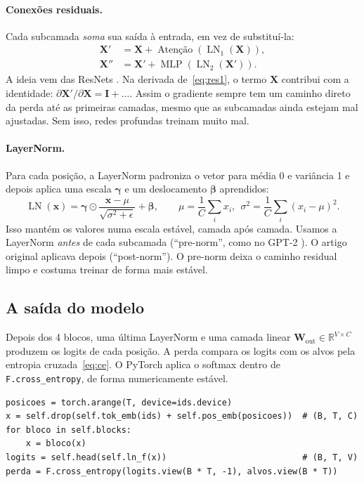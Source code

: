 \documentclass[11pt,a4paper]{article}
\newcommand{\R}{\mathbb{R}}
\newcommand{\LN}{\operatorname{LN}}
\begin{document}
\paragraph{Conexões residuais.} Cada subcamada \emph{soma} sua saída à entrada, em vez de substituí-la:
\begin{align}
\bm X' &= \bm X + \operatorname{Atenção}(\LN_1(\bm X)), \label{eq:res1}\\
\bm X'' &= \bm X' + \operatorname{MLP}(\LN_2(\bm X')). \label{eq:res2}
\end{align}
A ideia vem das ResNets \cite{he2016}. Na derivada de~\eqref{eq:res1}, o termo $\bm X$ contribui com a identidade: $\partial \bm X'/\partial \bm X = \bm I + \dots$. Assim o gradiente sempre tem um caminho direto da perda até as primeiras camadas, mesmo que as subcamadas ainda estejam mal ajustadas. Sem isso, redes profundas treinam muito mal.

\paragraph{LayerNorm.} Para cada posição, a LayerNorm \cite{layernorm} padroniza o vetor para média 0 e variância 1 e depois aplica uma escala $\bm\gamma$ e um deslocamento $\bm\beta$ aprendidos:
\begin{equation}
\LN(\bm x) = \bm\gamma \odot \frac{\bm x - \mu}{\sqrt{\sigma^2 + \epsilon}} + \bm\beta,
\qquad \mu = \frac1C\sum_i x_i,\ \ \sigma^2 = \frac1C\sum_i (x_i-\mu)^2.
\end{equation}
Isso mantém os valores numa escala estável, camada após camada. Usamos a LayerNorm \emph{antes} de cada subcamada (``pre-norm'', como no GPT-2 \cite{radford2019}). O artigo original \cite{vaswani} aplicava depois (``post-norm''). O pre-norm deixa o caminho residual limpo e costuma treinar de forma mais estável.

\subsection{A saída do modelo}

Depois dos 4 blocos, uma última LayerNorm e uma camada linear $\bm W_{\text{out}} \in \R^{V\times C}$ produzem os logits de cada posição. A perda compara os logits com os alvos pela entropia cruzada~\eqref{eq:ce}. O PyTorch aplica o softmax dentro de \texttt{F.cross\_entropy}, de forma numericamente estável.

\begin{nocodigo}
\begin{lstlisting}
posicoes = torch.arange(T, device=ids.device)
x = self.drop(self.tok_emb(ids) + self.pos_emb(posicoes))  # (B, T, C)
for bloco in self.blocks:
    x = bloco(x)
logits = self.head(self.ln_f(x))                           # (B, T, V)
perda = F.cross_entropy(logits.view(B * T, -1), alvos.view(B * T))
\end{lstlisting}
\end{nocodigo}
\end{document}

